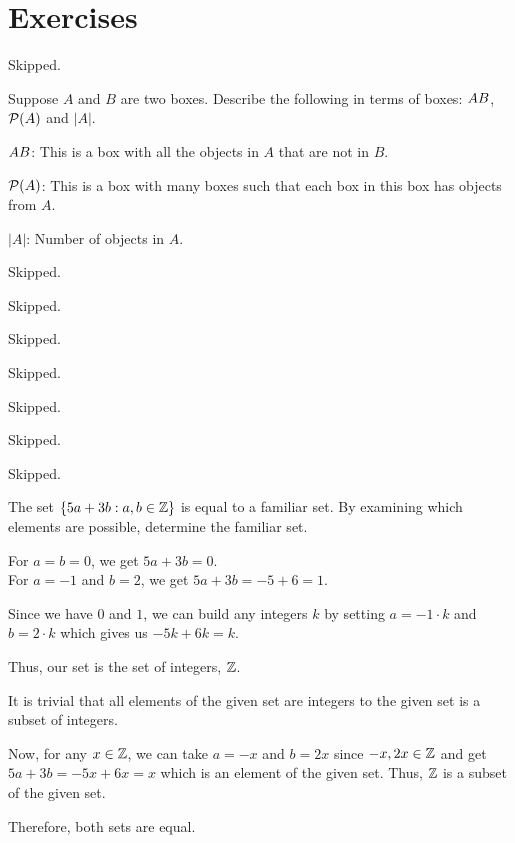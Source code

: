 \section*{Exercises}


\begin{problem}Skipped.\end{problem}

\begin{problem}
	Suppose $A$ and $B$ are two boxes. Describe the following in terms of boxes: $A \\ B$, $\mathcal{P}(A)$ and $|A|$.
\end{problem}
\begin{solution}
	$A \\ B$: This is a box with all the objects in $A$ that are not in $B$.

	$\mathcal{P}(A)$: This is a box with many boxes such that each box in this box has objects from $A$.

	$|A|$: Number of objects in $A$.
\end{solution}


\begin{problem}Skipped.\end{problem}
\begin{problem}Skipped.\end{problem}
\begin{problem}Skipped.\end{problem}
\begin{problem}Skipped.\end{problem}
\begin{problem}Skipped.\end{problem}
\begin{problem}Skipped.\end{problem}
\begin{problem}Skipped.\end{problem}

\begin{problem}
	The set $\{5a+3b: a, b \in \mathbb{Z}\}$ is equal to a familiar set. By examining which elements are possible, determine the familiar set.
\end{problem}

\begin{solution}
	For $a = b = 0$, we get $5a + 3b = 0$. \\
	For $a = -1$ and $b = 2$, we get $5a + 3b = -5+6 = 1$.

	Since we have $0$ and $1$, we can build any integers $k$ by setting $a = -1 \cdot k$ and $b = 2 \cdot k$ which gives us $-5k+6k = k$.

	Thus, our set is the set of integers, $\mathbb{Z}$.

	It is trivial that all elements of the given set are integers to the given set is a subset of integers.

	Now, for any $x \in \mathbb{Z}$, we can take $a = -x$ and $b = 2x$ since $-x, 2x \in \mathbb{Z}$ and get $5a + 3b = -5x + 6x = x$ which is an element of the given set.
	Thus, $\mathbb{Z}$ is a subset of the given set.

	Therefore, both sets are equal.

\end{solution}

